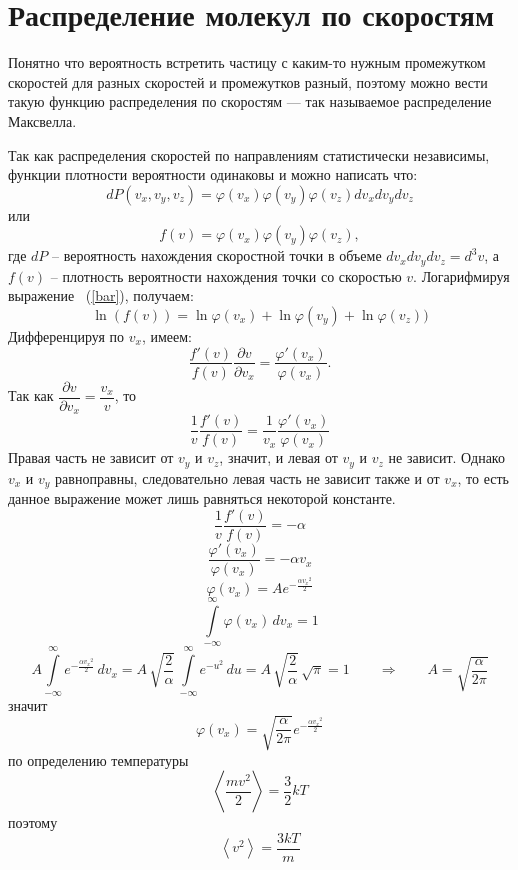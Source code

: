 \section{Распределение молекул по скоростям}


	Понятно что вероятность встретить частицу с каким-то нужным промежутком скоростей для разных скоростей и промежутков разный, поэтому можно вести такую функцию распределения по скоростям --- так называемое распределение Максвелла. \par
	Так как распределения скоростей по направлениям статистически независимы, функции плотности вероятности одинаковы и можно написать что:
		$$dP(v_x ,v_y , v_z )=\varphi (v_x) \varphi (v_y) \varphi (v_z) dv_x dv_y dv_z$$ или
	\begin{equation}\label{bar}
		f(v) = \varphi (v_x) \varphi (v_y) \varphi (v_z),
	\end{equation}
	где $dP$ -- вероятность нахождения скоростной точки в объеме $dv_x dv_y dv_z = d^3 v$, а $f(v)$ -- плотность вероятности нахождения точки со скоростью $v$.
	Логарифмируя выражение ~(\ref{bar}), получаем:
		$$\ln(f(v)) = \ln\varphi(v_x) + \ln\varphi(v_y) + \ln\varphi(v_z))$$
	Дифференцируя по $v_x$, имеем:
		$$\frac{f'(v)}{f(v)} \frac{\partial v}{\partial v_x} = \frac{\varphi '(v_x)}{\varphi(v_x)}.$$
	Так как  $\dfrac{\partial v}{\partial v_x} =  \dfrac{v_x}{v}$, то 
		$$\frac{1}{v} \frac{f'(v)}{f(v)} = \frac{1}{v_x} \frac{\varphi '(v_x)}{\varphi(v_x)}$$
	Правая часть не зависит от $v_y$  и $v_z$, значит, и левая от $v_y$  и $v_z$ не зависит. Однако $v_x$ и $ v_y$ равноправны, следовательно левая часть не зависит также и от $v_x$, то есть данное выражение может лишь равняться некоторой константе.
	$$\frac{1}{v} \frac{f'(v)}{f(v)} = - \alpha$$
	$$\frac{\varphi '(v_x)}{\varphi(v_x)} = - \alpha v_x $$
	$$\varphi (v_x) = A e^{-\frac{\alpha {v_x}^2}{2}} $$
	$$\int\limits_{-\infty} ^ {\infty} \varphi(v_x) \, dv_x = 1$$  
	$$A \int\limits_{-\infty} ^ {\infty} e^{-\frac{\alpha {v_x}^2}{2}} \, dv_x =  A \, \sqrt{\frac{2}{\alpha}} \, \int\limits_{-\infty} ^ {\infty} e^{- u^2} \, du =  A \, \sqrt{\frac{2}{\alpha}} \, \sqrt{\pi} = 1 \qquad \Rightarrow \qquad A = \sqrt{\frac{\alpha}{2 \pi}}$$
	значит
	$$\varphi (v_x) = \sqrt{\frac{\alpha}{2 \pi}} e^{-\frac{\alpha {v_x}^2}{2}}$$
	по определению температуры
	$$\left\langle\frac{mv^2}{2}\right\rangle = \frac{3}{2}kT $$
	поэтому $$\left\langle v^2\right\rangle = \frac{3kT}{m}$$

